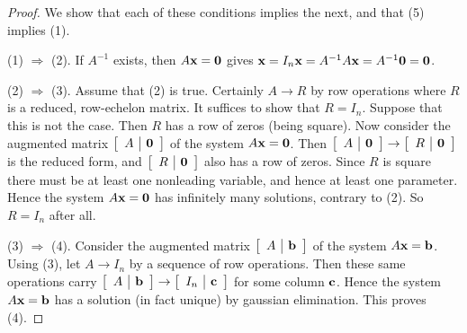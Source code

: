 \begin{proof}
We show that each of these conditions implies the next, and that (5) implies (1).

(1) $\Rightarrow$ (2). If $A^{-1}$ exists, then $A\textbf{x} = \textbf{0}$ gives $\textbf{x} = I_{n}\textbf{x} = A^{-1}A\textbf{x} = A^{-1}\textbf{0} = \textbf{0}$.


(2) $\Rightarrow$ (3). Assume that (2) is true. Certainly $A \to R$ by row operations where $R$ is a reduced, row-echelon matrix. It suffices to show that $R = I_{n}$. Suppose that this is not the case. Then $R$ has a row of zeros (being square). Now consider the augmented matrix $\left[ \begin{array}{c|c}
A & \textbf{0}
\end{array} \right]$ of the system $A\textbf{x} = \textbf{0}$. Then $\left[ \begin{array}{c|c}
A & \textbf{0}
\end{array} \right] \to \left[ \begin{array}{c|c}
	R & \textbf{0}
\end{array} \right]$ is the reduced form, and $\left[ \begin{array}{c|c}
R & \textbf{0}
\end{array} \right]$ also has a row of zeros. Since $R$ is square there must be at least one nonleading variable, and hence at least one parameter. Hence the system $A\textbf{x} = \textbf{0}$ has infinitely many solutions, contrary to (2). So $R = I_{n}$ after all.


(3) $\Rightarrow$ (4). Consider the augmented matrix $\left[ \begin{array}{c|c}
A & \textbf{b}
\end{array} \right]$ of the system $A\textbf{x} = \textbf{b}$. Using (3), let $A \to I_{n}$ by a sequence of row operations. Then these same operations carry $\left[ \begin{array}{c|c}
A & \textbf{b}
\end{array} \right] \to \left[ \begin{array}{c|c}
I_{n} & \textbf{c}
\end{array} \right]$ for some column $\textbf{c}$. Hence the system $A\textbf{x} = \textbf{b}$ has a solution (in fact unique) by gaussian elimination. This proves (4).



\end{proof}
